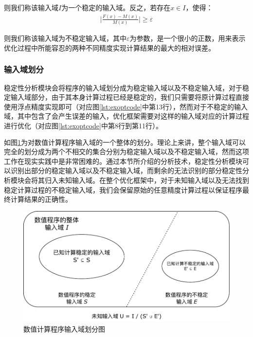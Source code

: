 则我们称该输入域$I$为一个稳定的输入域。反之，若存在$x \in I$，使得：
\begin{align*}
  \Big|\frac{F(x)-M(x)}{M(x)}\Big| \geq \varepsilon
\end{align*}

则我们称该输入域为不稳定输入域，其中$\varepsilon$为参数，是一个很小的正数，用来表示优化过程中所能容忍的两种不同精度实现计算结果的最大的相对误差。

\subsubsection{输入域划分}

稳定性分析模块会将程序的输入域划分成为稳定输入域以及不稳定输入域，对于稳定输入域部分，由于其本身计算过程已经是稳定的，我们只需要将原计算过程直接使用浮点精度实现即可（对应图\ref{lst:exoptcode}中第13行），然而对于不稳定的输入域，其中包含了会产生误差的输入，优化框架需要对这样的输入域对应的计算过程进行优化（对应图\ref{lst:exoptcode}中第8行到第11行）。

如图\ref{fig:inputspace}为对数值计算程序输入域的一个整体的划分。理论上来讲，整个输入域可以完全的划分成为两个不相交的集合分别为稳定输入域以及不稳定输入域，然而这项工作在现实实践中是非常困难的。通过本节所介绍的分析技术，稳定性分析模块可以识别出部分的稳定输入域以及不稳定输入域，而剩余的无法识别的部分稳定性分析模块会将其归入未知输入域。在整个优化框架中，对于未知输入域以及无法找到稳定计算过程的不稳定输入域，我们会保留原始的任意精度计算过程以保证程序最终计算结果的正确性。

\begin{figure}[tb]
  \centering
  \includegraphics[width=\columnwidth]{fig/InputSpace.pdf}
  \vspace*{1mm}
  \caption{数值计算程序输入域划分图} \label{fig:inputspace} %
\end{figure}


